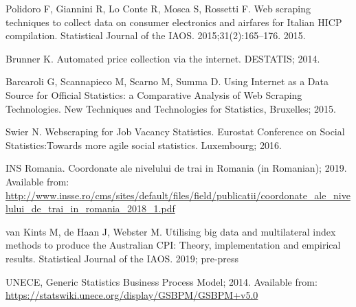 \documentclass[]{article}
\begin{document}
\begin{thebibliography}{99}
Polidoro F, Giannini R, Lo Conte R, Mosca S, Rossetti F. Web scraping techniques to collect data on consumer electronics and airfares for Italian HICP compilation. Statistical Journal of the IAOS. 2015;31(2):165–176.
2015.

Brunner K. Automated price collection via the internet. DESTATIS; 2014.

Barcaroli G, Scannapieco M, Scarno M, Summa D. Using Internet as a Data Source for Official Statistics: a Comparative Analysis of Web Scraping Technologies.
New Techniques and Technologies for Statistics, Bruxelles; 2015.


Swier N. Webscraping for Job Vacancy Statistics. Eurostat Conference on Social Statistics:Towards more agile social statistics. Luxembourg; 2016.

INS Romania. Coordonate ale nivelului de trai in Romania (in Romanian); 2019. Available from:
\url{http://www.insse.ro/cms/sites/default/files/field/publicatii/coordonate_ale_nivelului_de_trai_in_romania_2018_1.pdf}

van Kints M, de Haan J, Webster M. Utilising big data and multilateral index methods to produce the Australian CPI: Theory, implementation and empirical results. Statistical Journal of the IAOS. 2019; pre-press

UNECE, Generic Statistics Business Process Model; 2014. Available from:
\url{https://statswiki.unece.org/display/GSBPM/GSBPM+v5.0}


\end{thebibliography}
\end{document}
